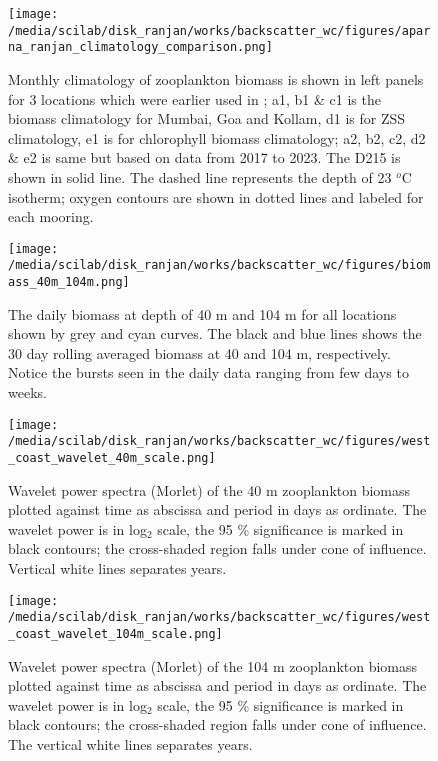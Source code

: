\documentclass{article}
\begin{document}
\begin{figure}[htbp]
	\centering
	\texttt{[image: /media/scilab/disk\_ranjan/works/backscatter\_wc/figures/aparna\_ranjan\_climatology\_comparison.png]} 
	\captionsetup{justification=justified,font=footnotesize,skip=0.05\baselineskip,width=\textwidth}
	\caption{Monthly climatology of zooplankton biomass is shown in left panels for 3 locations which were earlier used in \citep{aparna2022seasonal}; a1, b1 \& c1 is the biomass climatology for Mumbai, Goa and Kollam, d1 is for ZSS climatology, e1 is for chlorophyll biomass climatology; a2, b2, c2, d2 \& e2 is same but based on data from 2017 to 2023. The D215 is shown in solid line. The dashed line represents the depth of 23 $^o$C isotherm; oxygen contours are shown in dotted lines and labeled for each mooring.}
	\label{fig:zsschlclimcomp}
\end{figure}

\begin{figure}[htbp]
	\centering
	\texttt{[image: /media/scilab/disk\_ranjan/works/backscatter\_wc/figures/biomass\_40m\_104m.png]} 
	\captionsetup{justification=justified,font=footnotesize,skip=0.05\baselineskip,width=\textwidth}
	\caption{The daily biomass at depth of 40 m and 104 m for all locations shown by grey and cyan curves. The black and blue lines shows the 30 day rolling averaged biomass at 40 and 104 m, respectively. Notice the bursts seen in the daily data ranging from few days to weeks.}
	\label{fig:compfourty}
\end{figure}

\begin{figure}[htbp]
	\centering
	\texttt{[image: /media/scilab/disk\_ranjan/works/backscatter\_wc/figures/west\_coast\_wavelet\_40m\_scale.png]} 
	\captionsetup{justification=justified,font=footnotesize,skip=0.05\baselineskip,width=\textwidth}
	\caption{Wavelet power spectra (Morlet) of the 40 m zooplankton biomass plotted against time as abscissa and period in days as ordinate. The wavelet power is in log$_2$ scale, the 95 \% significance is marked in black contours; the cross-shaded region falls under cone of influence. Vertical white lines separates years.}
	\label{fig:wavefourty}
\end{figure}

\begin{figure}[htbp]
	\centering
	\texttt{[image: /media/scilab/disk\_ranjan/works/backscatter\_wc/figures/west\_coast\_wavelet\_104m\_scale.png]} 
	\captionsetup{justification=justified,font=footnotesize,skip=0.05\baselineskip,width=\textwidth}
	\caption{Wavelet power spectra (Morlet) of the 104 m zooplankton biomass plotted against time as abscissa and period in days as ordinate. The wavelet power is in log$_2$ scale, the 95 \% significance is marked in black contours; the cross-shaded region falls under cone of influence. The vertical white lines separates years.}
	\label{fig:wave104}
\end{figure}
\end{document}
